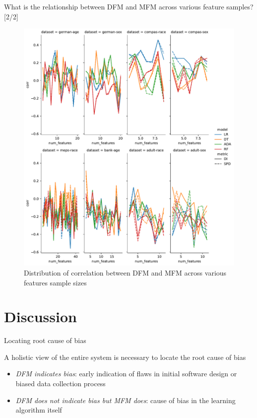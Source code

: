 \documentclass[aspectratio=169]{beamer}
\begin{document}
\begin{frame}{What is the relationship between DFM and MFM across
  various feature samples? [2/2]}
  \begin{figure}
    \centering
    \includegraphics[height=0.7\textheight, keepaspectratio]{lineplot--num-features--corr.pdf}
    \caption{Distribution of correlation between DFM and MFM across
      various features sample sizes}
    \label{fig:lineplot--num-features--corr}
  \end{figure}
\end{frame}

\section{Discussion} %

\begin{frame}{Locating root cause of bias}
  \begin{exampleblock}{A holistic view of the entire system is
    necessary to locate the root cause of bias}
    \begin{itemize}
      \item \emph{DFM indicates bias}: early indication of flaws in
        initial software design or biased data collection process
      \item \emph{DFM does not indicate bias but MFM does}: cause of
        bias in the learning algorithm itself
    \end{itemize}
  \end{exampleblock}
\end{frame}
\end{document}
